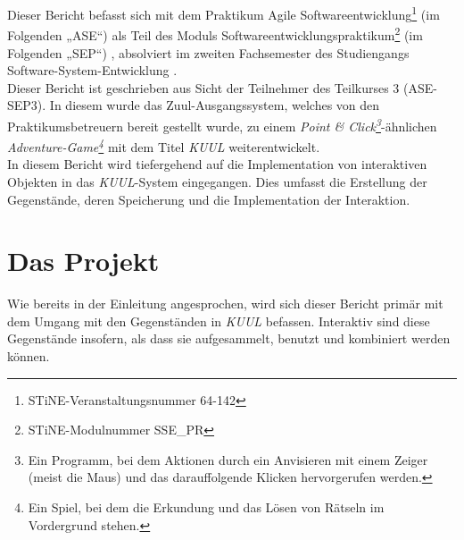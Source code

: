 \documentclass[12pt,twoside]{article}
\theoremstyle{plain}
\theoremstyle{definition}
\theoremstyle{remark}
\begin{document}
Dieser Bericht befasst sich mit dem Praktikum Agile Softwareentwicklung\footnote{STiNE-Veranstaltungsnummer 64-142} (im Folgenden „ASE“)
 als Teil des Moduls Softwareentwicklungspraktikum\footnote{STiNE-Modulnummer SSE\_PR} (im Folgenden „SEP“)
 , absolviert im zweiten Fachsemester %
des Studiengangs Software-System-Entwicklung %
.\\
Dieser Bericht ist geschrieben aus Sicht der Teilnehmer des Teilkurses 3 (ASE-SEP3).
In diesem wurde das Zuul-Ausgangssystem, welches von den Praktikumsbetreuern bereit gestellt wurde, zu einem \textit{Point \& Click\footnote{Ein Programm, bei dem Aktionen durch ein Anvisieren mit einem Zeiger (meist die Maus) und das darauffolgende Klicken hervorgerufen werden.}}-ähnlichen \textit{Adventure-Game\footnote{Ein Spiel, bei dem die Erkundung und das Lösen von Rätseln im Vordergrund stehen.}} mit dem Titel \textit{KUUL} weiterentwickelt.\\
In diesem Bericht wird tiefergehend auf die Implementation von interaktiven Objekten in das \textit{KUUL}-System eingegangen.
Dies umfasst die Erstellung der Gegenstände, deren Speicherung und die Implementation der Interaktion.

%

\section{Das Projekt}
\label{sec:main}
Wie bereits in der Einleitung angesprochen, wird sich dieser Bericht primär mit dem Umgang mit den Gegenständen in \textit{KUUL} befassen.
Interaktiv sind diese Gegenstände insofern, als dass sie aufgesammelt, benutzt und kombiniert werden können.\\

%
%
\end{document}
